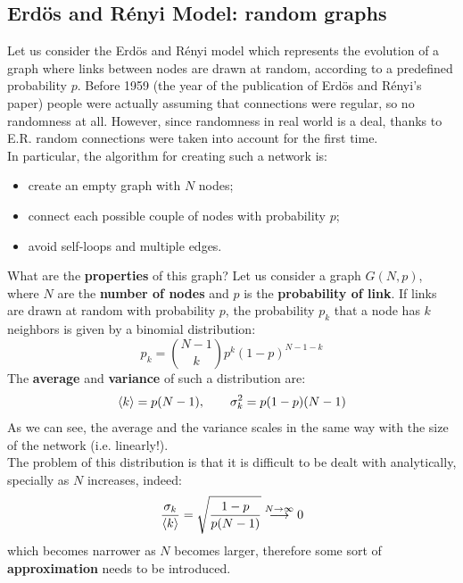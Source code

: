 \documentclass[../main/main.tex]{subfiles}
\begin{document}
\subsection{Erdös and Rényi Model: random graphs}
Let us consider the Erdös and Rényi model which represents the evolution of a graph where links between nodes are drawn at random, according to a predefined probability $p$. Before 1959 (the year of the publication of Erdös and Rényi's paper) people were actually assuming that connections were regular, so no randomness at all. However, since randomness in real world is a deal, thanks to E.R. random connections were taken into account for the first time.\\
In particular, the algorithm for creating such a network is:
\begin{itemize}
\item create an empty graph with $N$ nodes;
\item connect each possible couple of nodes with probability $p$;
\item avoid self-loops and multiple edges.
\end{itemize}
What are the \textbf{properties} of this graph?
Let us consider a graph \( G(N,p) \), where \( N \) are the \textbf{number of nodes} and \( p \) is the \textbf{probability of link}.
If links are drawn at random with probability $p$, the probability $p_k$ that a node has $k$ neighbors is given by a binomial distribution:
\begin{equation}
  p_k = \binom{N-1}{k} p^k (1-p)^{N-1-k}
\end{equation}
The \textbf{average} and \textbf{variance} of such a distribution are:
\begin{equation}
  \expval{k} = p(N-1), \qquad \sigma _k^2 = p(1-p)(N-1)
\end{equation}
As we can see, the average and the variance scales in the same way with the size of the network (i.e. linearly!).\\
The problem of this distribution is that it is difficult to be dealt with analytically, specially as \( N \) increases, indeed:
\begin{equation*}
  \frac{\sigma _k}{\expval{k} } = \sqrt{\frac{1-p}{p(N-1)}} \overset{N \rightarrow \infty }{\longrightarrow } 0
\end{equation*}
which becomes narrower as \( N \) becomes larger, therefore some sort of \textbf{approximation} needs to be introduced.\\
\end{document}
